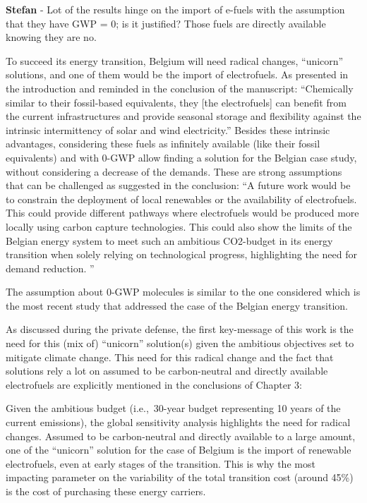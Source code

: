\documentclass[12pt,a4paper]{article}
\def\ie{i.e.,\ }
\begin{document}
\begin{mdframed}[style=comment] %
{\color{teal} \textbf{Stefan}} - Lot of the results hinge on the import of e-fuels with the assumption that they have GWP = 0; is it justified? Those fuels are directly available knowing they are no.
\end{mdframed}

\noindent To succeed its energy transition, Belgium will need radical changes, ``unicorn'' solutions, and one of them would be the import of electrofuels. As presented in the introduction and reminded in the conclusion of the manuscript: ``Chemically similar to their fossil-based equivalents, they [the electrofuels] can benefit from the current infrastructures and provide seasonal storage and flexibility against the intrinsic intermittency of solar and wind electricity.'' Besides these intrinsic advantages, considering these fuels as infinitely available (like their fossil equivalents) and with 0-GWP allow finding a solution for the Belgian case study, without considering a decrease of the demands.  These are strong assumptions that can be challenged as suggested in the conclusion: ``A future work would be to constrain the deployment of local renewables or the availability of electrofuels. This could provide different pathways where electrofuels would be produced more locally using carbon capture technologies. This could also show the limits of the Belgian energy system to meet such an ambitious CO2-budget in its energy transition when solely relying on technological progress, highlighting the need for demand reduction. ''

The assumption about 0-GWP molecules is similar to the one considered \cite{PATHS2050} which is the most recent study that addressed the case of the Belgian energy transition. 

As discussed during the private defense, the first key-message of this work is the need for this (mix of) ``unicorn'' solution(s) given the ambitious objectives set to mitigate climate change.  This need for this radical change and the fact that solutions rely a lot on assumed to be carbon-neutral and directly available electrofuels are explicitly mentioned {\color{blue}in the conclusions of Chapter 3}: 

\begin{mdframed}[style=manuscript] %
Given the ambitious  budget (\ie 30-year budget representing 10 years of the current emissions), the global sensitivity analysis highlights the need for radical changes. Assumed to be carbon-neutral and directly available to a large amount, one of the ``unicorn'' solution for the case of Belgium is the import of renewable electrofuels, even at early stages of the transition. This is why the most impacting parameter on the variability of the total transition cost (around 45\%) is the cost of purchasing these energy carriers.
\end{mdframed}
\end{document}
